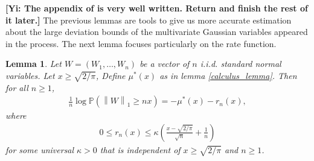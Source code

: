 \documentclass[10pt]{article}
\newcommand{\p}{\mathbb{P}}
\newcommand{\norm}[1]{\left\lVert#1\right\rVert}
\newcommand{\gy}[1]{\textbf{\color{red}[Yi: #1]}}
\newtheorem{lemma}{\bf Lemma}
\newenvironment{Proof of lemma}{\noindent{\bf Proof of Lemma}}{\hfill$\Box$\newline}
\newenvironment{Proof of claim}{\noindent{\bf Proof of claim}}{\hfill$\Box$\newline}
\newenvironment{Proof of theorem}{\noindent{\bf Proof of Theorem}}{\hfill\scriptsize{$\Box$}\newline}
\newenvironment{Proof of theorems}{\noindent{\bf Proof of Theorems}}{\hfill$\Box$\newline}
\newenvironment{Proof of proposition}{\noindent{\bf Proof of Proposition}}{\hfill$\Box$\newline}
\newenvironment{Proof of propositions}{\noindent{\bf Proof of Propositions}}{\hfill$\Box$\newline}
\newenvironment{Proof of exercise}{\noindent{\it Proof of Exercise:}}{\hfill$\Box$}
\numberwithin{equation}{section}
\begin{document}
\gy{The appendix of \cite{Prob_Method_Book} is very well written. Return and finish the rest of it later.}
The previous lemmas are tools to give us more accurate estimation about the large deviation bounds of the multivariate Gaussian variables appeared in the process. The next lemma focuses particularly on the rate function.
\begin{lemma} \label{ldp_lemma}
    Let $W = (W_1, \dots, W_n)$ be a vector of $n$ i.i.d. standard normal variables. Let $x \geq \sqrt{2/\pi}$, Define $\mu^*(x)$ as in lemma \ref{calculus_lemma}. Then for all $n \geq 1$,
    \begin{align}
        \frac{1}{n} \log \p(\norm{W}_1 \geq nx) = -\mu^*(x) -r_n(x),
    \end{align}
    where
    \begin{align}
        0 \leq r_n(x) \leq \kappa \left(\frac{x - \sqrt{2/\pi}}{\sqrt{n}}+\frac{1}{n}\right)
    \end{align}
    for some universal $\kappa >0$ that is independent of $x \geq \sqrt{2/\pi}$ and $n \geq 1$.
\end{lemma}
\end{document}
